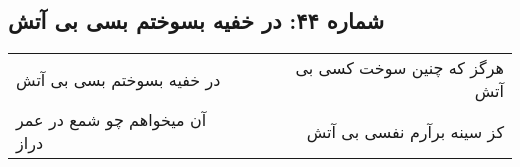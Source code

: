 \begin{center}
\section*{شماره ۴۴: در خفیه بسوختم بسی بی آتش}
\label{sec:044}
\begin{longtable}{l p{0.5cm} r}
در خفیه بسوختم بسی بی آتش
&&
هرگز که چنین سوخت کسی بی آتش
\\
آن میخواهم چو شمع در عمر دراز
&&
کز سینه برآرم نفسی بی آتش
\\
\end{longtable}
\end{center}
